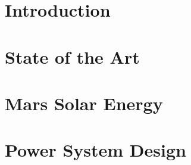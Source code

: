 \documentclass[%
    draft, %
    11pt,
    a4paper
]
{memoir}
\begin{document}



\chapter{Introduction}
\label{sec:Introduction}



\chapter{State of the Art}
\label{sec:StateOfTheArt}



\chapter{Mars Solar Energy}
\label{sec:MarsSolarEnergy}



\chapter{Power System Design}
\label{sec:PowerSystemDesign}


%
\end{document}
